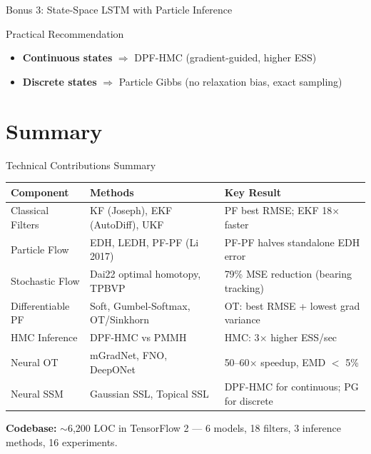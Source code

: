 \documentclass[aspectratio=169,10pt]{beamer}
\begin{document}
\begin{frame}{Bonus 3: State-Space LSTM with Particle Inference}
\vspace{0.5em}
\begin{alertblock}{Practical Recommendation}
\begin{itemize}
  \item \textbf{Continuous states} $\Rightarrow$ DPF-HMC (gradient-guided, higher ESS)
  \item \textbf{Discrete states} $\Rightarrow$ Particle Gibbs (no relaxation bias, exact sampling)
\end{itemize}
\end{alertblock}
\end{frame}


\section{Summary}

\begin{frame}{Technical Contributions Summary}
\begin{table}
\centering
\scriptsize
\begin{tabular}{@{}p{2.5cm}p{4.5cm}p{5.5cm}@{}}
  \toprule
  \textbf{Component} & \textbf{Methods} & \textbf{Key Result} \\
  \midrule
  Classical Filters & KF (Joseph), EKF (AutoDiff), UKF & PF best RMSE; EKF 18$\times$ faster \\
  \addlinespace
  Particle Flow & EDH, LEDH, PF-PF (Li 2017) & PF-PF halves standalone EDH error \\
  \addlinespace
  Stochastic Flow & Dai22 optimal homotopy, TPBVP & 79\% MSE reduction (bearing tracking) \\
  \addlinespace
  Differentiable PF & Soft, Gumbel-Softmax, OT/Sinkhorn & OT: best RMSE + lowest grad variance \\
  \addlinespace
  HMC Inference & DPF-HMC vs PMMH & HMC: 3$\times$ higher ESS/sec \\
  \addlinespace
  Neural OT & mGradNet, FNO, DeepONet & 50--60$\times$ speedup, EMD $<$ 5\% \\
  \addlinespace
  Neural SSM & Gaussian SSL, Topical SSL & DPF-HMC for continuous; PG for discrete \\
  \bottomrule
\end{tabular}
\end{table}

\vspace{0.5em}
\textbf{Codebase:} $\sim$6,200 LOC in TensorFlow 2 --- 6 models, 18 filters, 3 inference methods, 16 experiments.
\end{frame}
\end{document}

